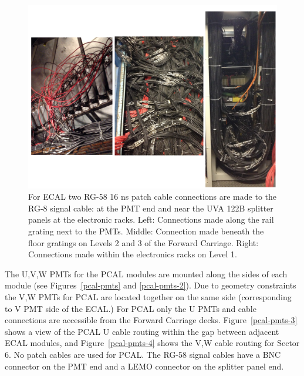 \documentclass[letterpaper,10pt]{article}
\begin{document}
\begin{figure}[htbp]
  \centering
  \includegraphics[width= 7in, keepaspectratio = true]{ecal-patch-cables.png}
  \vspace{2mm}
  \caption{For ECAL two RG-58 16 ns patch cable connections are made to the RG-8 signal cable: at the PMT
    end and near the UVA 122B splitter panels at the electronic racks.  Left: Connections
    made along the rail grating next to the PMTs.  Middle: Connection made beneath the floor gratings on
    Levels 2 and 3 of the Forward Carriage.  Right: Connections made within the electronics racks on Level 1.}
\label{ecal-patch-cables}
\end{figure}

The U,V,W PMTs for the PCAL modules are mounted along the sides of each module
(see Figures~\ref{pcal-pmts} and \ref{pcal-pmts-2}).  Due to geometry constraints the V,W PMTs for PCAL are located
together on the same side (corresponding to V PMT side of the ECAL.)  For PCAL only the U PMTs and cable connections
are accessible from the Forward Carriage decks.  Figure~\ref{pcal-pmts-3} shows a view of the PCAL U cable routing
within the gap between adjacent ECAL modules, and Figure~\ref{pcal-pmts-4} shows the V,W cable routing for Sector 6.
No patch cables are used for PCAL.  The RG-58 signal cables have a BNC connector on the PMT end and a
LEMO connector on the splitter panel end.
\end{document}
